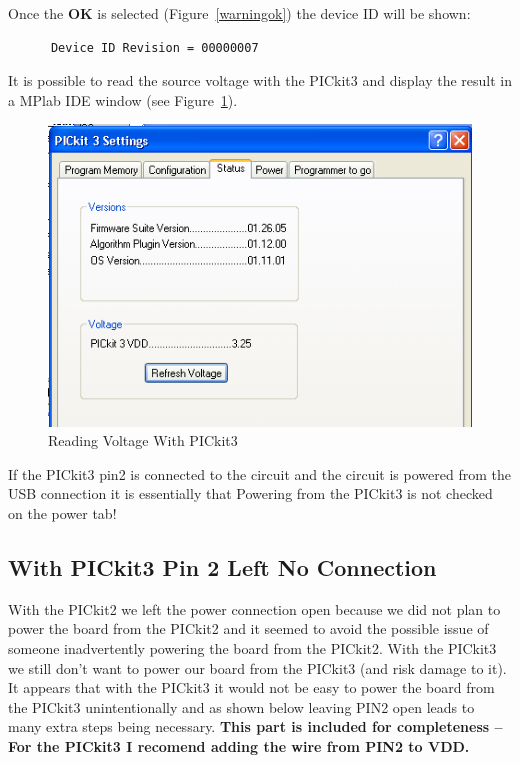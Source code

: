 \documentclass[twocolumn]{article}
\makeatletter
\def\maxwidth{\ifdim\Gin@nat@width>\linewidth\linewidth
\else\Gin@nat@width\fi}
\let\Oldincludegraphics\includegraphics
\renewcommand{\includegraphics}[1]{\Oldincludegraphics[width=\maxwidth]{#1}}
\makeatother
\begin{document}
Once the \textbf{OK} is selected (Figure~\ref{warningok}) the device ID will be shown:

\begin{verbatim}
      Device ID Revision = 00000007
\end{verbatim}

It is possible to read the source voltage with the PICkit3 and display the result in a MPlab IDE window (see Figure~\ref{readingvoltage}).

\begin{figure}[htbp]
\centering
\includegraphics{phys1600/pickit3_reading_voltage.png}
\caption{Reading Voltage With PICkit3}
\label{readingvoltage}
\end{figure}

If the PICkit3 pin2 is connected to the circuit and the circuit is
powered from the USB connection it is essentially that Powering from the
PICkit3 is not checked on the power tab!

\subsection{With PICkit3 Pin 2 Left No Connection}

With the PICkit2 we left the power connection open because we did not
plan to power the board from the PICkit2 and it seemed to avoid the
possible issue of someone inadvertently powering the board from the
PICkit2. With the PICkit3 we still don't want to power our board from
the PICkit3 (and risk damage to it). It appears that with the PICkit3 it
would not be easy to power the board from the PICkit3 unintentionally
and as shown below leaving PIN2 open leads to many extra steps being
necessary. \textbf{This part is included for completeness -- For the
PICkit3 I recomend adding the wire from PIN2 to VDD.}
\end{document}
